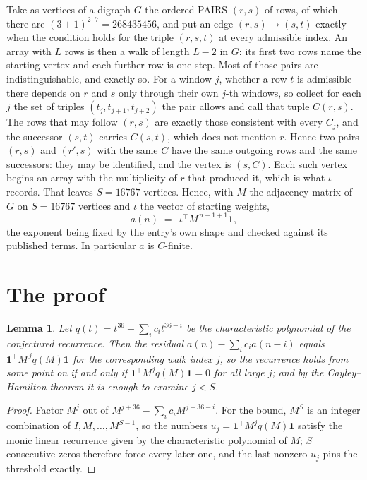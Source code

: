 \documentclass[11pt,a4paper]{article}
\theoremstyle{plain}
\newtheorem{lemma}[theorem]{Lemma}
\theoremstyle{definition}
\begin{document}
Take as vertices of a digraph $G$ the ordered PAIRS $(r,s)$ of rows, of which there are
$(3+1)^{2\cdot7}=268435456$, and put an edge $(r,s)\to(s,t)$ exactly when the condition
holds for the triple $(r,s,t)$ at every admissible index. An array with $L$ rows is then a
walk of length $L-2$ in $G$: its first two rows name the starting vertex and each further
row is one step. Most of those pairs are indistinguishable, and exactly so. For a window $j$, whether a row $t$ is admissible there depends on $r$ and $s$ only through their own $j$-th windows, so collect for each $j$ the set of triples $(t_j,t_{j+1},t_{j+2})$ the pair allows and call that tuple $C(r,s)$. The rows that may follow $(r,s)$ are exactly those consistent with every $C_j$, and the successor $(s,t)$ carries $C(s,t)$, which does not mention $r$. Hence two pairs $(r,s)$ and $(r',s)$ with the same $C$ have the same outgoing rows and the same successors: they may be identified, and the vertex is $(s,C)$. Each such vertex begins an array with the multiplicity of $r$ that produced it, which is what $\iota$ records. That leaves $S=16767$ vertices. Hence, with $M$ the adjacency matrix of $G$ on $S=16767$ vertices and
$\iota$ the vector of starting weights,
\[
a(n)\;=\;\,\iota^{\!\top}M^{\,n-1+1}\mathbf{1},
\]
the exponent being fixed by the entry's own shape and checked against its published terms.
In particular $a$ is $C$-finite.

\section{The proof}

\begin{lemma}\label{lem:crit}
Let $q(t)=t^{36}-\sum_i c_it^{36-i}$ be the characteristic polynomial of the
conjectured recurrence. Then the residual $a(n)-\sum_ic_ia(n-i)$ equals
$\mathbf{1}^{\!\top}M^{\,j}q(M)\mathbf{1}$ for the corresponding walk index
$j$, so the recurrence holds from some point on if and only if
$\mathbf{1}^{\!\top}M^{j}q(M)\mathbf{1}=0$ for all large $j$; and by the
Cayley--Hamilton theorem it is enough to examine $j<S$.
\end{lemma}

\begin{proof}
Factor $M^{j}$ out of $M^{j+36}-\sum_ic_iM^{j+36-i}$. For the bound, $M^{S}$
is an integer combination of $I,M,\dots,M^{S-1}$, so the numbers
$u_j=\mathbf{1}^{\!\top}M^{j}q(M)\mathbf{1}$ satisfy the monic linear recurrence given by
the characteristic polynomial of $M$; $S$ consecutive zeros therefore force every later one,
and the last nonzero $u_j$ pins the threshold exactly.
\end{proof}
\end{document}
